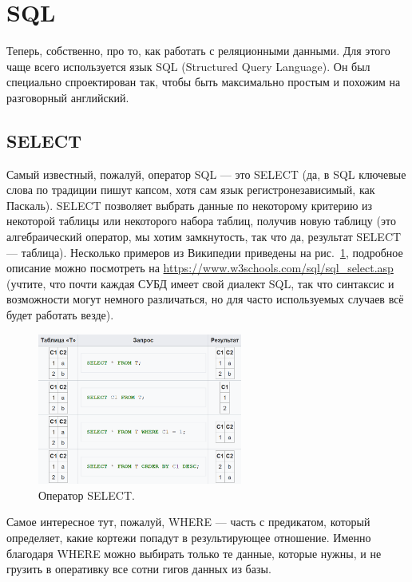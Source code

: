 \documentclass{../../text-style}
\begin{document}
\section{SQL}

Теперь, собственно, про то, как работать с реляционными данными. Для этого чаще всего используется язык SQL (Structured Query Language). Он был специально спроектирован так, чтобы быть максимально простым и похожим на разговорный английский. 

\subsection{SELECT}

Самый известный, пожалуй, оператор SQL --- это SELECT (да, в SQL ключевые слова по традиции пишут капсом, хотя сам язык регистронезависимый, как Паскаль). SELECT позволяет выбрать данные по некоторому критерию из некоторой таблицы или некоторого набора таблиц, получив новую таблицу (это алгебраический оператор, мы хотим замкнутость, так что да, результат SELECT --- таблица). Несколько примеров из Википедии приведены на рис.~\ref{image:select}, подробное описание можно посмотреть на \url{https://www.w3schools.com/sql/sql_select.asp} (учтите, что почти каждая СУБД имеет свой диалект SQL, так что синтаксис и возможности могут немного различаться, но для часто используемых случаев всё будет работать везде).

\begin{figure}
    \begin{center}
        \includegraphics[width=0.6\textwidth]{select.png}
    \end{center}
    \caption{Оператор SELECT.}
    \label{image:select}
\end{figure}

Самое интересное тут, пожалуй, WHERE --- часть с предикатом, который определяет, какие кортежи попадут в результирующее отношение. Именно благодаря WHERE можно выбирать только те данные, которые нужны, и не грузить в оперативку все сотни гигов данных из базы.
\end{document}
